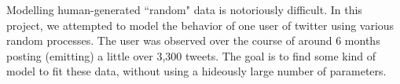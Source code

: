 Modelling human-generated ``random" data is notoriously difficult. In this project, we attempted to model the behavior of one user of twitter using various random processes. The user was observed over the course of around 6 months posting (emitting) a little over 3,300 tweets. The goal is to find some kind of model to fit these data, without using a hideously large number of parameters.